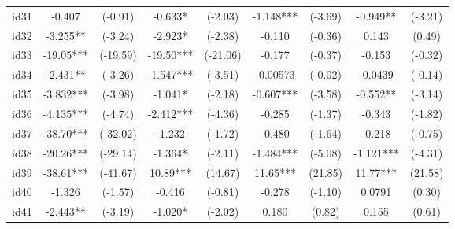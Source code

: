 \documentclass[entropy,article,submit,moreauthors,LaTeX and dvi2pdf]{Definitions/mdpi}
\begin{document}
\begin{center}
\begin{longtable}{ccccccccc}
id31                                          & -0.407        & (-0.91)       & -0.633*         & (-2.03)          & -1.148***         & (-3.69)           & -0.949**          & (-3.21)           \\
id32                                          & -3.255**      & (-3.24)       & -2.923*         & (-2.38)          & -0.110            & (-0.36)           & 0.143             & (0.49)            \\
id33                                          & -19.05***     & (-19.59)      & -19.50***       & (-21.06)         & -0.177            & (-0.37)           & -0.153            & (-0.32)           \\
id34                                          & -2.431**      & (-3.26)       & -1.547***       & (-3.51)          & -0.00573          & (-0.02)           & -0.0439           & (-0.14)           \\
id35                                          & -3.832***     & (-3.98)       & -1.041*         & (-2.18)          & -0.607***         & (-3.58)           & -0.552**          & (-3.14)           \\
id36                                          & -4.135***     & (-4.74)       & -2.412***       & (-4.36)          & -0.285            & (-1.37)           & -0.343            & (-1.82)           \\
id37                                          & -38.70***     & (-32.02)      & -1.232          & (-1.72)          & -0.480            & (-1.64)           & -0.218            & (-0.75)           \\
id38                                          & -20.26***     & (-29.14)      & -1.364*         & (-2.11)          & -1.484***         & (-5.08)           & -1.121***         & (-4.31)           \\
id39                                          & -38.61***     & (-41.67)      & 10.89***        & (14.67)          & 11.65***          & (21.85)           & 11.77***          & (21.58)           \\
id40                                          & -1.326        & (-1.57)       & -0.416          & (-0.81)          & -0.278            & (-1.10)           & 0.0791            & (0.30)            \\
id41                                          & -2.443**      & (-3.19)       & -1.020*         & (-2.02)          & 0.180             & (0.82)            & 0.155             & (0.61)            \\

\end{longtable}
\end{center}
\end{document}
